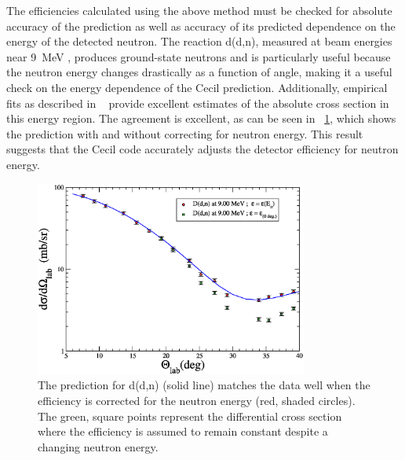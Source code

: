 The efficiencies calculated using the above method must be checked for absolute accuracy of the prediction as well as accuracy of its predicted dependence on the energy of the detected neutron.  The reaction d(d,n), measured at beam energies near 9~MeV \citep{deuteronCrossSections}, produces ground-state neutrons and is particularly useful because the neutron energy changes drastically as a function of angle, making it a useful check on the energy dependence of the Cecil prediction.  Additionally, empirical fits as described in {}~\citep{deuteronCrossSections} provide excellent estimates of the absolute cross section in this energy region.  The agreement is excellent, as can be seen in {\fig}~\ref{fig:DeuteriumMatch}, which shows the prediction with and without correcting for neutron energy.  This result suggests that the Cecil code accurately adjusts the detector efficiency for neutron energy.  
\begin{figure}[!htbp]
\centering
\includegraphics[width=0.8\textwidth]{figures/deuteriumMatch.eps}
\caption[Matching the detector efficiency with d(d,n).]{The prediction for d(d,n) (solid line) matches the data well when the efficiency is corrected for the neutron energy (red, shaded circles).  The green, square points represent the differential cross section where the efficiency is assumed to remain constant despite a changing neutron energy.}
\label{fig:DeuteriumMatch}
\end{figure}

